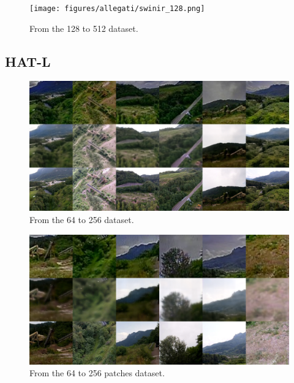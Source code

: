 \begin{figure}[H]
  \centering
  \texttt{[image: figures/allegati/swinir\_128.png]}
  \caption{From the 128 to 512 dataset.}
  \label{img:esrgan_att}
\end{figure}

\subsection{HAT-L}

\begin{figure}[H]
  \centering
  \includegraphics[scale=0.45]{figures/allegati/hatl_64.png}
  \caption{From the 64 to 256 dataset.}
  \label{img:esrgan_att}
\end{figure}

\begin{figure}[H]
  \centering
  \includegraphics[scale=0.45]{figures/allegati/hatl_64_patches.png}
  \caption{From the 64 to 256 patches dataset.}
  \label{img:esrgan_att}
\end{figure}
